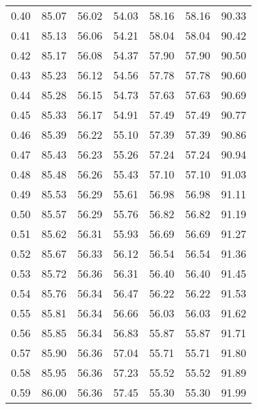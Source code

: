 \begin{tabular}{|c|c|c|c|c|c|c|}
      0.40 &     85.07 &     56.02 &      54.03 &   58.16 &      58.16 &         90.33 \\
      0.41 &     85.13 &     56.06 &      54.21 &   58.04 &      58.04 &         90.42 \\
      0.42 &     85.17 &     56.08 &      54.37 &   57.90 &      57.90 &         90.50 \\
      0.43 &     85.23 &     56.12 &      54.56 &   57.78 &      57.78 &         90.60 \\
      0.44 &     85.28 &     56.15 &      54.73 &   57.63 &      57.63 &         90.69 \\
      0.45 &     85.33 &     56.17 &      54.91 &   57.49 &      57.49 &         90.77 \\
      0.46 &     85.39 &     56.22 &      55.10 &   57.39 &      57.39 &         90.86 \\
      0.47 &     85.43 &     56.23 &      55.26 &   57.24 &      57.24 &         90.94 \\
      0.48 &     85.48 &     56.26 &      55.43 &   57.10 &      57.10 &         91.03 \\
      0.49 &     85.53 &     56.29 &      55.61 &   56.98 &      56.98 &         91.11 \\
      0.50 &     85.57 &     56.29 &      55.76 &   56.82 &      56.82 &         91.19 \\
      0.51 &     85.62 &     56.31 &      55.93 &   56.69 &      56.69 &         91.27 \\
      0.52 &     85.67 &     56.33 &      56.12 &   56.54 &      56.54 &         91.36 \\
      0.53 &     85.72 &     56.36 &      56.31 &   56.40 &      56.40 &         91.45 \\
      0.54 &     85.76 &     56.34 &      56.47 &   56.22 &      56.22 &         91.53 \\
      0.55 &     85.81 &     56.34 &      56.66 &   56.03 &      56.03 &         91.62 \\
      0.56 &     85.85 &     56.34 &      56.83 &   55.87 &      55.87 &         91.71 \\
      0.57 &     85.90 &     56.36 &      57.04 &   55.71 &      55.71 &         91.80 \\
      0.58 &     85.95 &     56.36 &      57.23 &   55.52 &      55.52 &         91.89 \\
      0.59 &     86.00 &     56.36 &      57.45 &   55.30 &      55.30 &         91.99 \\

\end{tabular}
